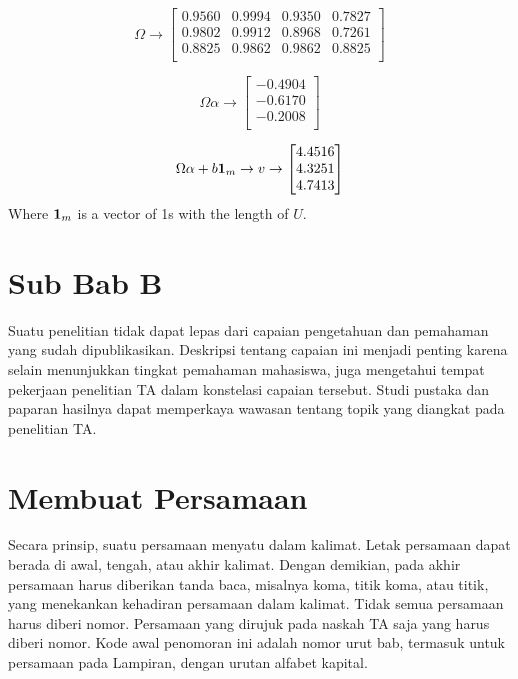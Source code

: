 \begin{equation}
        \Omega\to \begin{bmatrix}
                0.9560 & 0.9994 & 0.9350 & 0.7827 \\
                0.9802 & 0.9912 & 0.8968 & 0.7261 \\
                0.8825 & 0.9862 & 0.9862 & 0.8825 \\
        \end{bmatrix}
\end{equation}

\begin{equation}
        \Omega\alpha\to \begin{bmatrix}
                -0.4904 \\
                -0.6170 \\
                -0.2008 \\
        \end{bmatrix}
\end{equation}

\begin{equation}
        \Omega\alpha+b\vb{1}_{m}\to v\to \begin{bmatrix}
                4.4516 \\
                4.3251 \\
                4.7413 \\
        \end{bmatrix}
\end{equation}
Where $\vb{1}_{m}$ is a vector of 1s with the length of $U$.

\section{Sub Bab B}
\noindent Suatu penelitian tidak dapat lepas dari capaian pengetahuan dan pemahaman yang sudah dipublikasikan. Deskripsi tentang capaian ini menjadi penting karena selain menunjukkan tingkat pemahaman mahasiswa, juga mengetahui tempat pekerjaan penelitian TA dalam konstelasi capaian tersebut. Studi pustaka dan paparan hasilnya dapat memperkaya wawasan tentang topik yang diangkat pada penelitian TA.

\section{Membuat Persamaan}
\noindent Secara prinsip, suatu persamaan menyatu dalam kalimat. Letak persamaan dapat berada di awal, tengah, atau akhir kalimat. Dengan demikian, pada akhir persamaan harus diberikan tanda baca, misalnya koma, titik koma, atau titik, yang menekankan kehadiran persamaan dalam kalimat. Tidak semua persamaan harus diberi nomor. Persamaan yang dirujuk pada naskah TA saja yang harus diberi nomor. Kode awal penomoran ini adalah nomor urut bab, termasuk untuk persamaan pada Lampiran, dengan urutan alfabet kapital.

